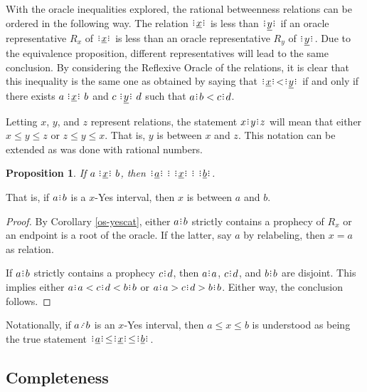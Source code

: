 \documentclass[12pt]{article}
\newtheorem{proposition}{Proposition}[section]
\begin{document}
With the oracle inequalities explored, the rational betweenness relations can be ordered in the following way. The relation $\xrel$ is less than $\xrel[y]$ if an oracle representative $R_x$ of $\xrel$ is less than an oracle representative $R_y$ of $\xrel[y]$. Due to the equivalence proposition, different representatives will lead to the same conclusion. By considering the Reflexive Oracle of the relations, it is clear that this inequality is the same one as obtained by saying that $\xrel \hspace{0.5pt} < \hspace{0.5pt} \xrel[y]$ if and only if there exists $a \xrel b$ and $c \xrel[y] d$ such that $a\rint b < c\rint d$. 

Letting $x$, $y$, and $z$ represent relations, the statement $x\rint y\rint z$ will mean that either $x \leq y \leq z$ or $z \leq y \leq x$. That is, $y$ is between $x$ and $z$. This notation can be extended as was done with rational numbers. 

\begin{proposition}
    If $a \xrel b$, then $\xrel[a] \rint  \xrel \rint  \xrel[b]$.
\end{proposition}

That is, if $a\rint b$ is a $x$-Yes interval, then $x$ is between $a$ and $b$.

\begin{proof}
    By Corollary \ref{os-yescat}, either $a \rint b$ strictly contains a prophecy of $R_x$ or an endpoint is a root of the oracle. If the latter, say $a$ by relabeling, then $x = a$ as relation. 

    If $a\rint b$ strictly contains a prophecy $c\rint d$, then $a\rint a$, $c\rint d$, and $b\rint b$ are disjoint. This implies either $a\rint a < c\rint d < b\rint b$ or $a\rint a > c\rint d > b\rint b$. Either way, the conclusion follows.  
\end{proof}

Notationally, if $a \lte b$ is an $x$-Yes interval, then $a \leq x \leq b$ is understood as being the true statement $\xrel[a] \hspace{0.5pt} \leq \hspace{0.5pt} \xrel \hspace{0.5pt} \leq  \hspace{0.5pt} \xrel[b]$. 


\subsection{Completeness}
\end{document}
